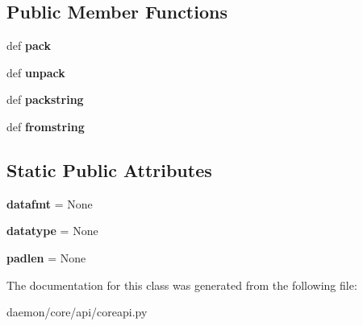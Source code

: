 \subsection*{Public Member Functions}
\begin{DoxyCompactItemize}
\item 
\hypertarget{classcore_1_1api_1_1coreapi_1_1_core_tlv_data_a028c22cc41dcd5f1a8b6c7dd8a85334f}{def {\bfseries pack}}\label{classcore_1_1api_1_1coreapi_1_1_core_tlv_data_a028c22cc41dcd5f1a8b6c7dd8a85334f}

\item 
\hypertarget{classcore_1_1api_1_1coreapi_1_1_core_tlv_data_aa8d22f7fe9eaa0b8d3cc7b8c4373166a}{def {\bfseries unpack}}\label{classcore_1_1api_1_1coreapi_1_1_core_tlv_data_aa8d22f7fe9eaa0b8d3cc7b8c4373166a}

\item 
\hypertarget{classcore_1_1api_1_1coreapi_1_1_core_tlv_data_a379b84c66d28fd45068e5ffb791cf522}{def {\bfseries packstring}}\label{classcore_1_1api_1_1coreapi_1_1_core_tlv_data_a379b84c66d28fd45068e5ffb791cf522}

\item 
\hypertarget{classcore_1_1api_1_1coreapi_1_1_core_tlv_data_a3e864ed1d19e44e4e50ac82324e9e432}{def {\bfseries fromstring}}\label{classcore_1_1api_1_1coreapi_1_1_core_tlv_data_a3e864ed1d19e44e4e50ac82324e9e432}

\end{DoxyCompactItemize}
\subsection*{Static Public Attributes}
\begin{DoxyCompactItemize}
\item 
\hypertarget{classcore_1_1api_1_1coreapi_1_1_core_tlv_data_a26ebe60face5e140492c0252ffe246de}{{\bfseries datafmt} = None}\label{classcore_1_1api_1_1coreapi_1_1_core_tlv_data_a26ebe60face5e140492c0252ffe246de}

\item 
\hypertarget{classcore_1_1api_1_1coreapi_1_1_core_tlv_data_ad04d7b29947efb1384d5781afeb03f55}{{\bfseries datatype} = None}\label{classcore_1_1api_1_1coreapi_1_1_core_tlv_data_ad04d7b29947efb1384d5781afeb03f55}

\item 
\hypertarget{classcore_1_1api_1_1coreapi_1_1_core_tlv_data_a664477fd671c90fd0b53a56a83186340}{{\bfseries padlen} = None}\label{classcore_1_1api_1_1coreapi_1_1_core_tlv_data_a664477fd671c90fd0b53a56a83186340}

\end{DoxyCompactItemize}


The documentation for this class was generated from the following file\+:\begin{DoxyCompactItemize}
\item 
daemon/core/api/coreapi.\+py\end{DoxyCompactItemize}
